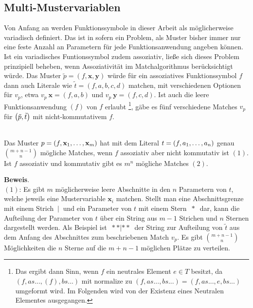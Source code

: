 \subsection{Multi-Mustervariablen} \label{subsecMulti}

Von Anfang an werden Funktionssymbole in dieser Arbeit als möglicherweise variadisch definiert. Das ist in sofern ein Problem, als Muster bisher immer nur eine feste Anzahl an Parametern für jede Funktionsanwendung angeben können. Ist ein variadisches Funtionssymbol zudem assoziativ, ließe sich dieses Problem prinzipiell beheben, wenn Assoziativität im Matchalgorithmus berücksichtigt würde. Das Muster $\tilde p = (f, \mathbf x, \mathbf y)$ würde für ein assoziatives Funktionssymbol $f$ dann auch Literale wie $\tilde t = (f, a, b, c, d)$ matchen, mit verschiedenen Optionen für $v_p$, etwa $v_p~\mathbf x = (f, a, b)$ und $v_p~\mathbf y = (f, c, d)$. Ist auch die leere Funktionsanwendung $(f)$ von $f$ erlaubt \footnote{Das ergibt dann Sinn, wenn $f$ ein neutrales Element $e \in T$ besitzt, da $(f, as..., (f), bs...)$ mit $\mathrm{normalize}$ zu $(f, as..., bs...) = (f, as..., e, bs...)$ umgeformt wird. Im Folgenden wird von der Existenz eines Neutralen Elementes ausgegangen.}, gäbe es fünf verschiedene Matches $v_p$ für $\paren*{\tilde p, \tilde t}$ mit nicht-kommutativem $f$.

\begin{lemma}~\\
Das Muster $p = (f, \elems {\mathbf x} 1 m)$ hat mit dem Literal $t = (f, \elems a 1 n)$ genau ${m + n - 1}\choose n$ mögliche Matches, wenn $f$ assoziativ aber nicht kommutativ ist $(1)$. Ist $f$ assoziativ und kommutativ gibt es $m^n$ mögliche Matches $(2)$.\\
\end{lemma}

\textbf{Beweis}.\\
$(1)$: Es gibt $m$ möglicherweise leere Abschnitte in den $n$ Parametern von $t$, welche jeweils eine Mustervariable $\mathbf x_i$ matchen. Stellt man eine Abschnittsgrenze mit einem Strich $~|~$ und ein Parameter von $t$ mit einem Stern $~*~$ dar, kann die Aufteilung der Parameter von $t$ über ein String aus $m - 1$ Strichen und $n$ Sternen dargestellt werden. 
Als Beispiel ist $~**|**~$ der String zur Aufteilung von $\tilde t$ aus dem Anfang des Abschnittes zum beschriebenen Match $v_p$.
Es gibt ${m + n - 1}\choose n$ Möglichkeiten die $n$ Sterne auf die ${m + n - 1}$ möglichen Plätze zu verteilen.\\

